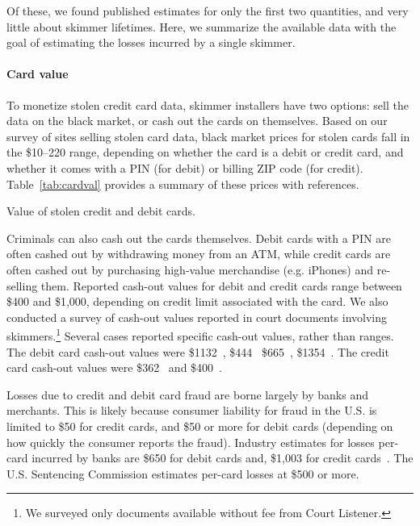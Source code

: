 Of these, we found published estimates for only the first two quantities, and very little about skimmer lifetimes. Here, we summarize the available data with the goal of estimating the losses incurred by a single skimmer.

\paragraph{Card value} To monetize stolen credit card data, skimmer installers have two options: sell the data on the black market, or cash out the cards on themselves. Based on our survey of sites selling stolen card data, black market prices for stolen cards fall in the \$10--220 range, depending on whether the card is a debit or credit card, and whether it comes with a PIN (for debit) or billing ZIP code (for credit). Table~\ref{tab:cardval} provides a summary of these prices with references. 

\begin{table}
\caption{Value of stolen credit and debit cards.}

\label{tab:cardval}
\end{table}

Criminals can also cash out the cards themselves. Debit cards with a PIN are often cashed out by withdrawing money from an ATM, while credit cards are often cashed out by purchasing high-value merchandise (e.g. iPhones) and re-selling them. Reported cash-out values for debit and credit cards range between \$400 and \$1,000, depending on credit limit associated with the card.
%
We also conducted a survey of cash-out values reported in court documents involving skimmers.\footnote{We surveyed only documents available without fee from Court Listener.} Several cases reported specific cash-out values, rather than ranges. The debit card cash-out values were \$1132~\cite{hristov}, \$444~\cite{cristea} \$665~\cite{alisuretove}, \$1354~\cite{mekhakian}. The credit card cash-out values were \$362~\cite{aqel} and \$400~\cite{estrada}.

Losses due to credit and debit card fraud are borne largely by banks and merchants. This is likely because consumer liability for fraud in the U.S. is limited to \$50 for credit cards, and \$50 or more for debit cards (depending on how quickly the consumer reports the fraud).  Industry estimates for losses per-card incurred by banks are \$650 for debit cards and, \$1,003 for credit cards~\cite{arizonareport,ATMIA}. The U.S. Sentencing Commission estimates per-card losses at \$500 or more.

